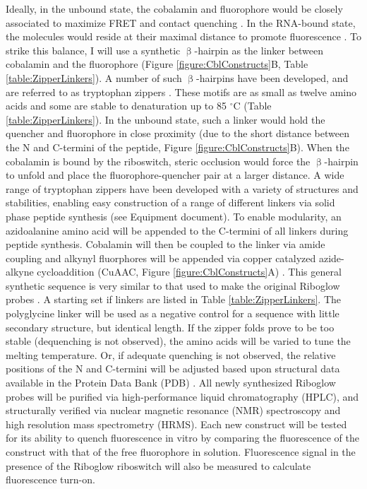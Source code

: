 Ideally, in the unbound state, the cobalamin and fluorophore would be closely associated to maximize FRET and contact quenching \cite{RosendahlSynthesisbiologicalactivity1982,ShellVitaminB12Tunable2015,ShellTunableVisibleNearIR2014}.
In the RNA-bound state, the molecules would reside at their maximal distance to promote fluorescence \cite{LeeDesignSynthesisCharacterization2009}.
To strike this balance, I will use a synthetic $\upbeta$-hairpin as the linker between cobalamin and the fluorophore (Figure \ref{figure:CblConstructs}B, Table \ref{table:ZipperLinkers}).
A number of such $\upbeta$-hairpins have been developed, and are referred to as tryptophan zippers \cite{CochranTryptophanzippersStable2001}.
These motifs are as small as twelve amino acids and some are stable to denaturation up to 85 $^\circ$C (Table \ref{table:ZipperLinkers}).
In the unbound state, such a linker would hold the quencher and fluorophore in close proximity (due to the short distance between the N and C-termini of the peptide, Figure \ref{figure:CblConstructs}B).
When the cobalamin is bound by the riboswitch, steric occlusion would force the $\upbeta$-hairpin to unfold and place the fluorophore-quencher pair at a larger distance.
A wide range of tryptophan zippers have been developed with a variety of structures and stabilities, enabling easy construction of a range of different linkers via solid phase peptide synthesis \cite{CochranTryptophanzippersStable2001,KierProbingLowerSize2008,AndersenMinimizationOptimizationDesigned2006,FesinmeyerEnhancedHairpinStability2004} (see Equipment document).
To enable modularity, an azidoalanine amino acid will be appended to the C-termini of all linkers during peptide synthesis.
Cobalamin will then be coupled to the linker via amide coupling and alkynyl fluorphores will be appended via copper catalyzed azide-alkyne cycloaddition (CuAAC, Figure \ref{figure:CblConstructs}A) \cite{KolbHartmuthC.ClickChemistryDiverse2001,PattersonFindingRightBioorthogonal2014}.
This general synthetic sequence is very similar to that used to make the original Riboglow probes \cite{BraselmannDevelopmentriboswitchbasedplatform2017}.
A starting set if linkers are listed in Table \ref{table:ZipperLinkers}.
The polyglycine linker will be used as a negative control for a sequence with little secondary structure, but identical length.
If the zipper folds prove to be too stable (dequenching is not observed), the amino acids will be varied to tune the melting temperature.
Or, if adequate quenching is not observed, the relative positions of the N and C-termini will be adjusted based upon structural data available in the Protein Data Bank (PDB) \cite{AndersenMinimizationOptimizationDesigned2006}.
All newly synthesized Riboglow probes will be purified via high-performance liquid chromatography (HPLC), and structurally verified via nuclear magnetic resonance (NMR) spectroscopy and high resolution mass spectrometry (HRMS).
Each new construct will be tested for its ability to quench fluorescence in vitro by comparing the fluorescence of the construct with that of the free fluorophore in solution. Fluorescence signal in the presence of the Riboglow riboswitch will also be measured to calculate fluorescence turn-on.

